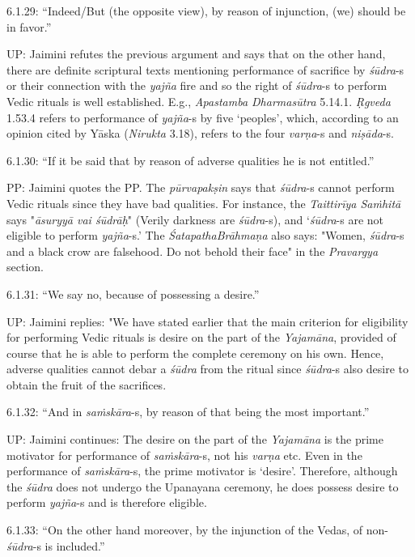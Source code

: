 6.1.29: “Indeed/But (the opposite view), by reason of injunction, (we) should be in favor.”

UP: Jaimini refutes the previous argument and says that on the other hand, there are definite scriptural texts mentioning performance of sacrifice by \textit{śūdra}-s or their connection with the \textit{yajña} fire and so the right of \textit{śūdra}-s to perform Vedic rituals is well established. E.g., \textit{Apastamba Dharmasūtra} 5.14.1. \textit{Ṛgveda} 1.53.4 refers to performance of \textit{yajña}-s by five ‘peoples’, which, according to an opinion cited by Yāska (\textit{Nirukta} 3.18), refers to the four \textit{varṇa}-s and \textit{niṣāda}-s.

6.1.30: “If it be said that by reason of adverse qualities he is not entitled.”

PP: Jaimini quotes the PP. The \textit{pūrvapakṣin} says that \textit{śūdra}-s cannot perform Vedic rituals since they have bad qualities. For instance, the \textit{Taittirīya Saṁhitā} says "\textit{āsuryyā vai śūdrāḥ}" (Verily darkness are \textit{śūdra}-s), and ‘\textit{śūdra}-s are not eligible to perform \textit{yajña}-s.’ The \textit{ŚatapathaBrāhmaṇa} also says: "Women, \textit{śūdra}-s and a black crow are falsehood. Do not behold their face" in the \textit{Pravargya} section.

6.1.31: “We say no, because of possessing a desire.”

UP: Jaimini replies: "We have stated earlier that the main criterion for eligibility for performing Vedic rituals is desire on the part of the \textit{Yajamāna}, provided of course that he is able to perform the complete ceremony on his own. Hence, adverse qualities cannot debar a \textit{śūdra} from the ritual since \textit{śūdra}-s also desire to obtain the fruit of the sacrifices.

6.1.32: “And in \textit{saṁskāra}-s, by reason of that being the most important.”

UP: Jaimini continues: The desire on the part of the \textit{Yajamāna} is the prime motivator for performance of \textit{saṁskāra}-s, not his \textit{varṇa }etc. Even in the performance of \textit{saṁskāra}-s, the prime motivator is ‘desire’. Therefore, although the \textit{śūdra} does not undergo the Upanayana ceremony, he does possess desire to perform \textit{yajña}-s and is therefore eligible.

6.1.33: “On the other hand moreover, by the injunction of the Vedas, of non-\textit{śūdra}-s is included.”

